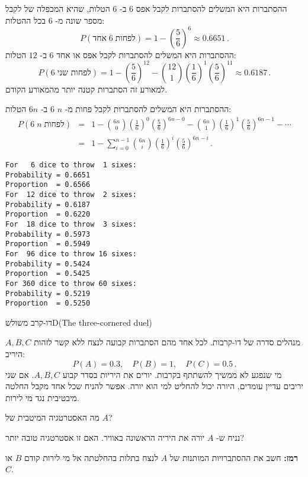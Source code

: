 \solution{}

ההסתברות היא המשלים להסתברות לקבל אפס 
$6$
ב-%
$6$
הטלות, שהיא המכפלה של לקבל מספר שונה מ-%
$6$
בכל ההטלות:
\[
P(\textrm{אחד} \; 6\; \textrm{לפחות})=1-\left(\frac{5}{6}\right)^6\approx 0.6651\,.
\]
ההסתברות היא המשלים להסתברות לקבל אפס או אחד
$6$
ב-%
$12$
הטלות:
\[
P(6\; \textrm{לפחות שני})=1-\left(\frac{5}{6}\right)^{12}-{12\choose 1}\left(\frac{1}{6}\right)^{1}\left(\frac{5}{6}\right)^{11}\approx 0.6187\,.
\]
למאורע זה הסתברות קטנה יותר מהמאורע הקודם.

ההסתברות היא המשלים להסתברות לקבל פחות מ-%
$n$ $6$
ב-%
$6n$
הטלות:
\begin{eqnarray*}
P(6\; n\;\textrm{לפחות})&=&
  1-{6n \choose 0}\left(\frac{1}{6}\right)^0\left(\frac{5}{6}\right)^{6n-0}-
  {6n\choose 1}\left(\frac{1}{6}\right)^{1}\left(\frac{5}{6}\right)^{6n-1}-\cdots\\
&=&1-\sum_{i=0}^{n-1}{6n\choose i}\left(\frac{1}{6}\right)^{i}\left(\frac{5}{6}\right)^{6n-i}\,.
\end{eqnarray*}

\sml{}

\begin{verbatim}
For   6 dice to throw  1 sixes:
Probability = 0.6651
Proportion  = 0.6566
For  12 dice to throw  2 sixes:
Probability = 0.6187
Proportion  = 0.6220
For  18 dice to throw  3 sixes:
Probability = 0.5973
Proportion  = 0.5949
For  96 dice to throw 16 sixes:
Probability = 0.5424
Proportion  = 0.5425
For 360 dice to throw 60 sixes:
Probability = 0.5219
Proportion  = 0.5250
\end{verbatim}



\begin{prob}{דו-קרב משולש}{D}{(The three-cornered duel)}

$A,B,C$
מנהלים סדרה של דו-קרבות. לכל אחד מהם הסתברות קבועה לנצח ללא קשר לזהות היריב:
\[
P(A)=0.3,\quad P(B)=1, \quad P(C)=0.5\,.
\]
מי שנפגע לא ממשיך להשתתף בקרבות. יורים את היריות בסדר קבוע 
$A,B,C$.
אם שני יריבים עדיין עומדים, היורה יכול להחליט למי הוא יורה. אפשר להניח שכל אחד מקבל החלטה מיבטיבית נגד מי לירות.

מה האסטרטגיה המיטבית של
$A$?

נניח ש-%
$A$
יורה את היריה הראשונה באוויר. האם זו אסטרטגיה טובה יותר?

\textbf{רמז:}
חשב את ההסתברויות המותנות של 
$A$
לנצח בתלות בהחלטתה אל מי לירות קודם
$B$
או
$C$.
\end{prob}

